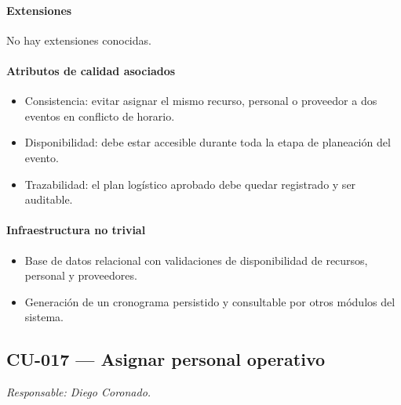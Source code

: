 \paragraph{Extensiones}
No hay extensiones conocidas.

\paragraph{Atributos de calidad asociados}
\begin{itemize}[leftmargin=1.4em, topsep=1pt]
  \item Consistencia: evitar asignar el mismo recurso, personal o proveedor a dos eventos en conflicto de horario.
  \item Disponibilidad: debe estar accesible durante toda la etapa de planeación del evento.
  \item Trazabilidad: el plan logístico aprobado debe quedar registrado y ser auditable.
\end{itemize}

\paragraph{Infraestructura no trivial}
\begin{itemize}[leftmargin=1.4em, topsep=1pt]
  \item Base de datos relacional con validaciones de disponibilidad de recursos, personal y proveedores.
  \item Generación de un cronograma persistido y consultable por otros módulos del sistema.
\end{itemize}

\subsection{CU-017 --- Asignar personal operativo}
\label{cu:cu-017}
\textit{Responsable: Diego Coronado.}

